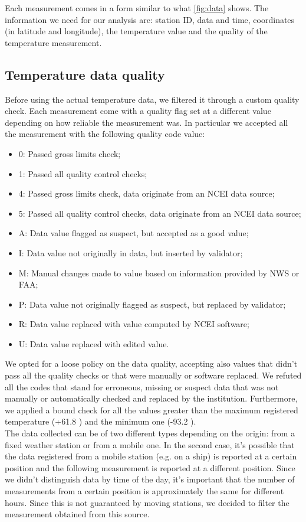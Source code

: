 \documentclass{vldb}
\begin{document}
Each measurement comes in a form similar to what \ref{fig:data} shows. The information we need for our analysis are: station ID, data and time, coordinates (in latitude and longitude), the temperature value and the quality of the temperature measurement.


\subsection{Temperature data quality}
\label{sec:filter}
Before using the actual temperature data, we filtered it through a custom quality check. Each measurement come with a quality flag set at a different value depending on how reliable the measurement was\cite{noaaDataFormat}. In particular we accepted all the measurement with the following quality code value:
\begin{itemize}
    \item 0: Passed gross limits check;
    \item 1: Passed all quality control checks;
    \item 4: Passed gross limits check, data originate from an NCEI data source;
    \item 5: Passed all quality control checks, data originate from an NCEI data source;
    \item A: Data value flagged as suspect, but accepted as a good value;
    \item I: Data value not originally in data, but inserted by validator;
    \item M: Manual changes made to value based on information provided by NWS or FAA;
    \item P: Data value not originally flagged as suspect, but replaced by validator;
    \item R: Data value replaced with value computed by NCEI software;
    \item U: Data value replaced with edited value.
\end{itemize}
We opted for a loose policy on the data quality, accepting also values that didn't pass all the quality checks or that were manually or software replaced. We refuted all the codes that stand for erroneous, missing or suspect data that was not manually or automatically checked and replaced by the institution. Furthermore, we applied a bound check for all the values greater than the maximum registered temperature (+61.8 \celsius) and the minimum one (-93.2 \celsius). \\
The data collected can be of two different types depending on the origin: from a fixed weather station or from a mobile one. In the second case, it's possible that the data registered from a mobile station (e.g. on a ship) is reported at a certain position and the following measurement is reported at a different position. Since we didn't distinguish data by time of the day, it's important that the number of measurements from a certain position is approximately the same for different hours. Since this is not guaranteed by moving stations, we decided to filter the measurement obtained from this source. \\
\end{document}
